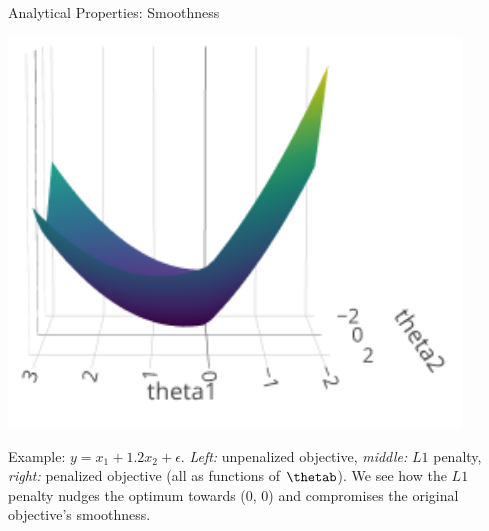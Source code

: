 \begin{vbframe}{Analytical Properties: Smoothness}
\begin{minipage}[c]{0.3\textwidth}
  \includegraphics[width=0.9\textwidth]{figure/lasso_penalized}
\end{minipage}%

\tiny Example: $y = x_1 + 1.2 x_2 + \epsilon$. \textit{Left:} unpenalized 
objective, \textit{middle:} $L1$ penalty, \textit{right:} penalized objective 
(all as functions of $\thetab$). We see how the $L1$ penalty nudges the optimum 
towards (0, 0) and compromises the original objective's smoothness.

\end{vbframe}


